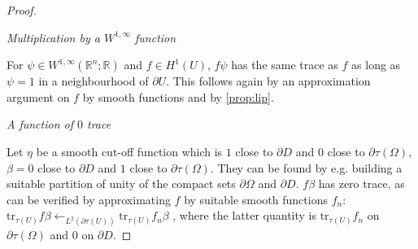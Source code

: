 \documentclass[english,a4paper,9pt,oneside]{scrbook}	%
\theoremstyle{break}
\newenvironment{mproof}[1][\proofname]{%
  \begin{proof}[#1]$ $\par\nobreak\ignorespaces
}{%
  \end{proof}
}
\renewcommand*{\proofname}{Proof}
\theoremstyle{remark}
\newcommand{\mR}{\mathbb{R}}
\newcommand{\ds}{\displaystyle}
\newcommand{\norm}[1]{\left\lVert#1\right\rVert}
\newcommand{\tr}{\text{tr}}
\begin{document}
\begin{appendices}
\begin{mproof}
%
%
%
%

\textit{Multiplication by a $W^{1,\infty}$ function}

For $\psi \in W^{1,\infty}(\mR^n;\mR)$ and $f \in H^1(U)$, $f\psi$ has the same trace as $f$ as long as $\psi = 1$ in a neighbourhood of $\partial U$. This follows again by an approximation argument on $f$ by smooth functions and by \cref{prop:lip}.

%

\textit{A function of $0$ trace}

Let $\eta$ be a smooth cut-off function which is $1$ close to $\partial D$ and $0$ close to $\partial \tau(\Omega)$, $\beta=0$ close to $\partial D$ and $1$ close to $\partial \tau(\Omega)$. They can be found by e.g. building a suitable partition of unity of the compact sets $\partial \Omega$ and $\partial D$.
$f\beta$ has zero trace, as can be verified by approximating $f$ by suitable smooth functions $f_n$: 
$\ds\tr_{\tau(U)} f\beta \leftarrow_{L^2(\partial \tau(U))} \tr_{\tau(U)} f_n \beta $
, where the latter quantity is $\tr_{\tau(U)} f_n $ on $\partial \tau(\Omega)$ and $0$ on $\partial D$.


\end{mproof}
\end{appendices}
\end{document}
